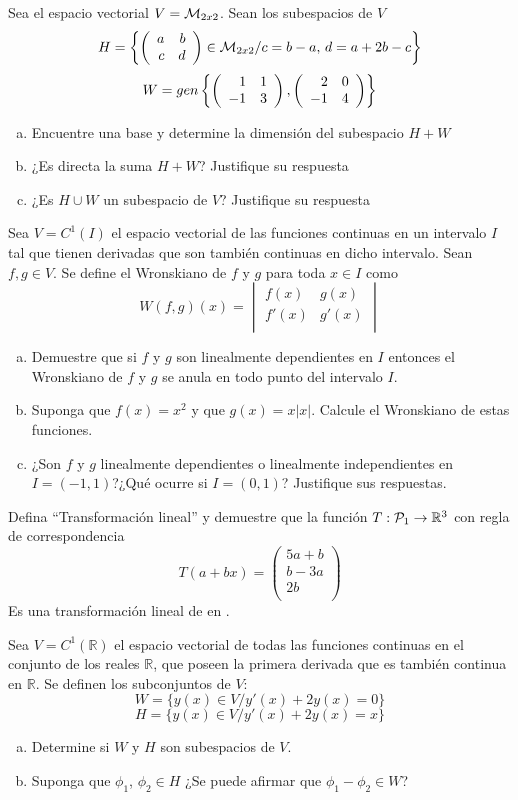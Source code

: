 \documentclass[10pt]{article}
\begin{document}
\problem{}
Sea el espacio vectorial $V = {\cal M}_{2x2}$. Sean los subespacios de $V$
\[H = \left\{ \left( \begin{array}{rr} a & b\\ c & d \end{array} \right) \in {\cal M}_{2x2}/ c=b-a,\,d=a+2b-c\right\}\]
\[W=gen\left\{ \left( \begin{array}{rr} 1 & 1\\ -1 & 3 \end{array} \right) , \left( \begin{array}{rr} 2 & 0\\ -1 & 4 \end{array} \right) \right\}\]
\begin{enumerate}[a.]
\item Encuentre una base y determine la dimensión del subespacio $H + W$
\item ¿Es directa la suma $H + W$? Justifique su respuesta
\item ¿Es $H \cup W$ un subespacio de $V$? Justifique su respuesta

\end{enumerate}

\problem{}
Sea $V = C^1 (I)$ el espacio vectorial de las funciones continuas en un intervalo $I$ tal que tienen derivadas que son también continuas en dicho intervalo. Sean $f,g \in V$. Se define el Wronskiano de $f$ y $g$ para toda $x \in I$ como
\[W(f,g)(x)=\begin{vmatrix}

f(x) & g(x)\\
f'(x) & g'(x)\\

\end{vmatrix}\]
\begin{enumerate}[a.]
\item Demuestre que si $f$ y $g$ son linealmente dependientes en $I$ entonces el Wronskiano de $f$ y $g$ se anula en todo punto del intervalo $I$.
\item Suponga que $f(x) = x^2$ y que $g(x) = x|x|$. Calcule el Wronskiano de estas funciones.
\item ¿Son $f$ y $g$ linealmente dependientes o linealmente independientes en $I = (-1,1)$?¿Qué ocurre si $I = (0,1)$? Justifique sus respuestas.

 
\end{enumerate}

\problem{}
Defina “Transformación lineal” y demuestre que la función $T : {\cal P}_1 \rightarrow \mathbb{R}^3$ con regla de correspondencia 
\[T(a + bx) = \begin{pmatrix}
5a + b\\
b - 3a\\
2b\\
\end{pmatrix}\]
Es una transformación lineal de \puno en \rtres.

\problem{}
Sea $V = C^1 (\mathbb{R})$ el espacio vectorial de todas las funciones continuas en el conjunto de los reales $\mathbb{R}$, que poseen la primera derivada que es también continua en $\mathbb{R}$. Se definen los subconjuntos de $V$:
\[W = \{y(x) \in V / y'(x) + 2y(x) = 0\}\]
\[H = \{y(x) \in V / y'(x) + 2y(x) = x\}\]
\begin{enumerate}[a.]
\item Determine si $W$ y $H$ son subespacios de $V$.
\item Suponga que $\phi_1$, $\phi_2 \in H$ ¿Se puede afirmar que $\phi_1 - \phi_2 \in W$? 
\end{enumerate}
\end{document}
